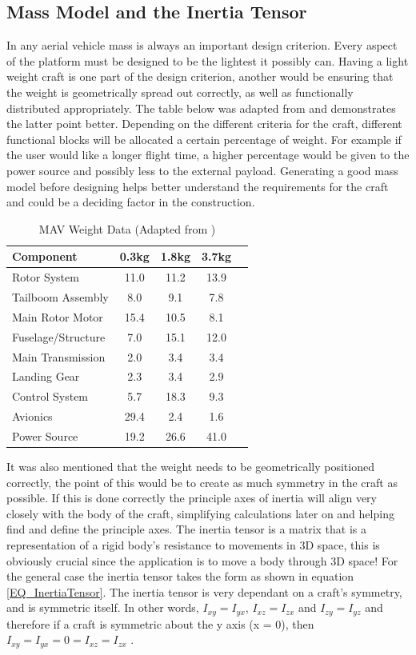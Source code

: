 \subsection{Mass Model and the Inertia Tensor}
In any aerial vehicle mass is always an important design criterion. Every aspect of the platform must be designed to be the lightest it possibly can. Having a light weight craft is one part of the design criterion, another would be ensuring that the weight is geometrically spread out correctly, as well as functionally distributed appropriately. The table below was adapted from \cite{NewMAV} and demonstrates the latter point better. Depending on the different criteria for the craft, different functional blocks will be allocated a certain percentage of weight. For example if the user would like a longer flight time, a higher percentage would be given to the power source and possibly less to the external payload. Generating a good mass model before designing helps better understand the requirements for the craft and could be a deciding factor in the construction.

\begin{table}[H]
\centering
\begin{tabular}{l | c | c | c | c}

Component 					& 0.3kg & 1.8kg & 3.7kg\\
\hline\hline
Rotor System 				& 11.0 & 11.2 & 13.9\\
Tailboom Assembly 		& 8.0 & 9.1 & 7.8\\
Main Rotor Motor 			& 15.4 & 10.5 & 8.1\\
Fuselage/Structure 			& 7.0 &  15.1 & 12.0\\
Main Transmission 			& 2.0 &  3.4 & 3.4\\
Landing Gear 				& 2.3 &  3.4 & 2.9\\
Control System 				& 5.7 & 18.3 & 9.3\\
Avionics 						& 29.4 &  2.4 & 1.6\\
Power Source 				& 19.2 & 26.6 & 41.0\\

\end{tabular}
\caption{MAV Weight Data (Adapted from \cite{NewMAV})}
\end{table}

It was also mentioned that the weight needs to be geometrically positioned correctly, the point of this would be to create as much symmetry in the craft as possible. If this is done correctly the principle axes of inertia will align very closely with the body of the craft, simplifying calculations later on and helping find and define the principle axes. The inertia tensor is a matrix that is a representation of a rigid body's resistance to movements in 3D space, this is obviously crucial since the application is to move a body through 3D space! For the general case the inertia tensor takes the form as shown in equation \eqref{EQ_InertiaTensor}. The inertia tensor is very dependant on a craft's symmetry, and is symmetric itself. In other words, $I_{xy} = I_{yx}$, $I_{xz} = I_{zx}$ and $I_{zy} = I_{yz}$ and therefore if a craft is symmetric about the y axis (x = 0), then $I_{xy} = I_{yx} = 0 = I_{xz} = I_{zx}$ \cite{Luukkonen, MiniFlying}.

